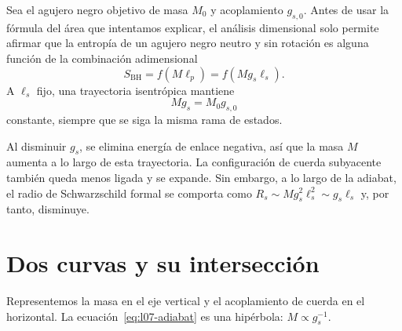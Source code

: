Sea el agujero negro objetivo de masa \(M_0\) y acoplamiento \(g_{s,0}\). Antes de usar la fórmula del área que intentamos explicar, el análisis dimensional solo permite afirmar que la entropía de un agujero negro neutro y sin rotación es alguna función de la combinación adimensional
\begin{equation}
S_{\mathrm{BH}}=f(M\ell_p)
=f(Mg_s\ell_s).
\label{eq:l07-entropy-function}
\end{equation}
A \(\ell_s\) fijo, una trayectoria isentrópica mantiene
\begin{equation}
Mg_s=M_0g_{s,0}
\label{eq:l07-adiabat}
\end{equation}
constante, siempre que se siga la misma rama de estados.

Al disminuir \(g_s\), se elimina energía de enlace negativa, así que la masa \(M\) aumenta a lo largo de esta trayectoria. La configuración de cuerda subyacente también queda menos ligada y se expande. Sin embargo, a lo largo de la adiabat, el radio de Schwarzschild formal se comporta como \(R_s\sim Mg_s^2\ell_s^2\sim g_s\ell_s\) y, por tanto, disminuye.

\begin{classroomqa}
\end{classroomqa}

\section{Dos curvas y su intersección}

Representemos la masa en el eje vertical y el acoplamiento de cuerda en el horizontal. La ecuación~\eqref{eq:l07-adiabat} es una hipérbola: \(M\propto g_s^{-1}\).

\begin{classroomqa}
\end{classroomqa}

